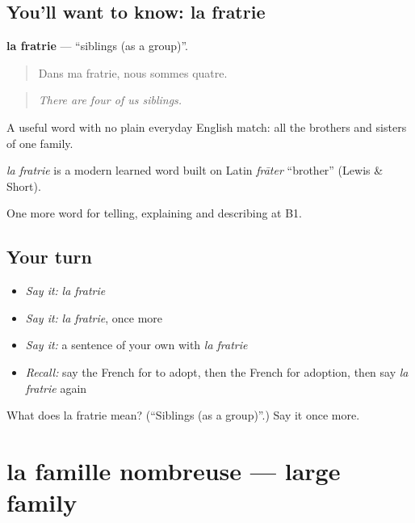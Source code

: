 \subsection*{You'll want to know: la fratrie}
\textbf{la fratrie} — \textquotedblleft{}siblings (as a group)\textquotedblright{}.

\begin{quote}
Dans ma fratrie, nous sommes quatre.
\end{quote}

\begin{quote}
\emph{There are four of us siblings.}
\end{quote}

A useful word with no plain everyday English match: all the brothers and sisters of one family.

\begin{cousinweb}
\emph{la fratrie} is a modern learned word built on Latin \emph{frāter} \textquotedblleft{}brother\textquotedblright{} (Lewis \& Short).
\end{cousinweb}

\begin{grammarlens}[title={What you've built}]
One more word for telling, explaining and describing at B1.
\end{grammarlens}

\subsection*{Your turn}
\begin{itemize}
\raggedright
  \item \emph{Say it:} \emph{la fratrie}
  \item \emph{Say it:} \emph{la fratrie}, once more
  \item \emph{Say it:} a sentence of your own with \emph{la fratrie}
  \item \emph{Recall:} say the French for to adopt, then the French for adoption, then say \emph{la fratrie} again
\end{itemize}

\begin{tcolorbox}[breakable,colback=teal!4,colframe=teal!35!black,title={Before you move on}]
What does la fratrie mean? (\textquotedblleft{}Siblings (as a group)\textquotedblright{}.) Say it once more.
\end{tcolorbox}
\section[la famille nombreuse]{la famille nombreuse — large family}

